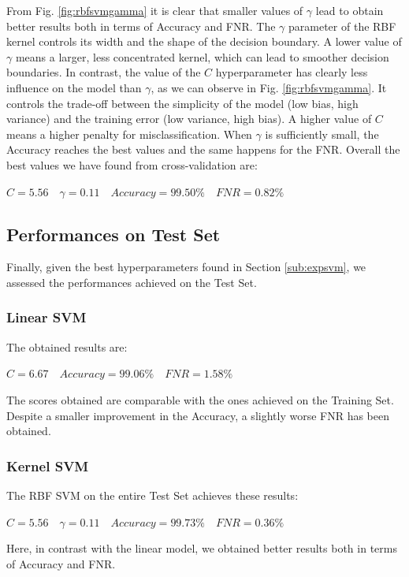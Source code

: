 \documentclass[twocolumn, switch]{article} %
\begin{document}
From Fig. \ref{fig:rbfsvmgamma} it is clear that smaller values of $\gamma$ lead to obtain better results both in terms of Accuracy and FNR. The $\gamma$ parameter of the RBF kernel controls its width and the shape of the decision boundary. A lower value of $\gamma$ means a larger, less concentrated kernel, which can lead to smoother decision boundaries.\newline
In contrast, the value of the $C$ hyperparameter has clearly less influence on the model than $\gamma$, as we can observe in Fig. \ref{fig:rbfsvmgamma}. It controls the trade-off between the simplicity of the model (low bias, high variance) and the training error (low variance, high bias). A higher value of $C$ means a higher penalty for misclassification.
When $\gamma$ is sufficiently small, the Accuracy reaches the best values and the same happens for the FNR.
Overall the best values we have found from cross-validation are:
\begin{center}
	$C=5.56\quad\gamma=0.11 \quad Accuracy=99.50\% \quad FNR=0.82\%$
\end{center}

\subsection{Performances on Test Set}
Finally, given the best hyperparameters found in Section \ref{sub:expsvm}, we assessed the performances achieved on the Test Set.
\subsubsection{Linear SVM}
The obtained results are:
\begin{center}
	$C=6.67 \quad Accuracy=99.06\% \quad FNR=1.58\%$
\end{center}
The scores obtained are comparable with the ones achieved on the Training Set. Despite a smaller improvement in the Accuracy, a slightly worse FNR has been obtained.

\subsubsection{Kernel SVM}
The RBF SVM on the entire Test Set achieves these results:
\begin{center}
	$C=5.56 \quad \gamma=0.11 \quad Accuracy=99.73\% \quad FNR=0.36\%$
\end{center}
Here, in contrast with the linear model, we obtained better results both in terms of Accuracy and FNR.
\end{document}
